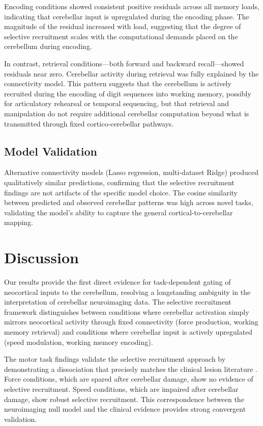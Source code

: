 \documentclass[11pt]{article}
\begin{document}
Encoding conditions showed consistent positive residuals across all memory loads, indicating that cerebellar input is upregulated during the encoding phase. The magnitude of the residual increased with load, suggesting that the degree of selective recruitment scales with the computational demands placed on the cerebellum during encoding.

In contrast, retrieval conditions---both forward and backward recall---showed residuals near zero. Cerebellar activity during retrieval was fully explained by the connectivity model. This pattern suggests that the cerebellum is actively recruited during the encoding of digit sequences into working memory, possibly for articulatory rehearsal or temporal sequencing, but that retrieval and manipulation do not require additional cerebellar computation beyond what is transmitted through fixed cortico-cerebellar pathways.

\subsection{Model Validation}

Alternative connectivity models (Lasso regression, multi-dataset Ridge) produced qualitatively similar predictions, confirming that the selective recruitment findings are not artifacts of the specific model choice. The cosine similarity between predicted and observed cerebellar patterns was high across novel tasks, validating the model's ability to capture the general cortical-to-cerebellar mapping.

\section{Discussion}

Our results provide the first direct evidence for task-dependent gating of neocortical inputs to the cerebellum, resolving a longstanding ambiguity in the interpretation of cerebellar neuroimaging data. The selective recruitment framework distinguishes between conditions where cerebellar activation simply mirrors neocortical activity through fixed connectivity (force production, working memory retrieval) and conditions where cerebellar input is actively upregulated (speed modulation, working memory encoding).

The motor task findings validate the selective recruitment approach by demonstrating a dissociation that precisely matches the clinical lesion literature \citep{spencer2003,bastian2006}. Force conditions, which are spared after cerebellar damage, show no evidence of selective recruitment. Speed conditions, which are impaired after cerebellar damage, show robust selective recruitment. This correspondence between the neuroimaging null model and the clinical evidence provides strong convergent validation.
\end{document}
